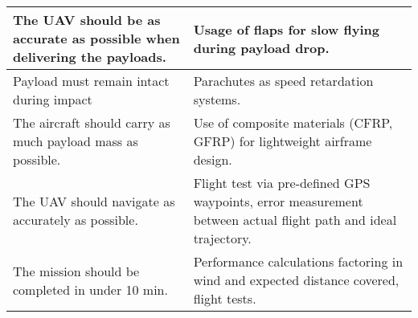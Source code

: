 \begin{longtable}{@{\makebox[0.08\textwidth][l]{\rownumber}} | p{} | p{}}
	The UAV should be as accurate as possible when delivering the payloads. & Usage of flaps for slow flying during payload drop. \\ \hline
	Payload must remain intact during impact & Parachutes as speed retardation systems. \\ \hline
	The aircraft should carry as much payload mass as possible. & Use of composite materials (CFRP, GFRP) for lightweight airframe design. \\ \hline
	The UAV should navigate as accurately as possible. & Flight test via pre-defined GPS waypoints, error measurement between actual flight path and ideal trajectory. \\ \hline
	The mission should be completed in under 10 min. & Performance calculations factoring in wind and expected distance covered, flight tests. \\
\end{longtable}

